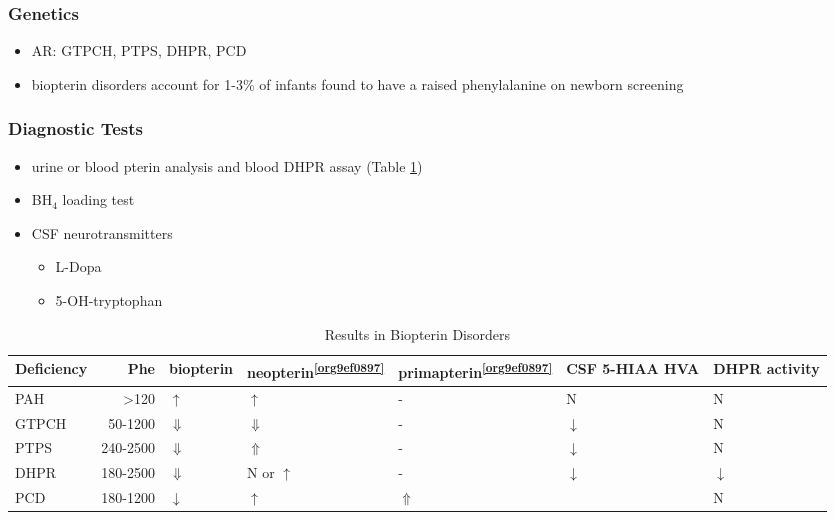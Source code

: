 \documentclass{scrartcl}
\begin{document}
\subsubsection{Genetics}
\label{sec:org8d8c6e4}
\begin{itemize}
\item AR: GTPCH, PTPS, DHPR, PCD
\item biopterin disorders account for 1-3\% of infants found to have a
raised phenylalanine on newborn screening
\end{itemize}

\subsubsection{Diagnostic Tests}
\label{sec:orgf03ea16}
\begin{itemize}
\item urine or blood pterin analysis and blood DHPR assay (Table \ref{tab:org2ac06a1})
\item BH\(_{\text{4}}\) loading test
\item CSF neurotransmitters
\begin{itemize}
\item L-Dopa
\item 5-OH-tryptophan
\end{itemize}
\end{itemize}

\begin{table}[htbp]
\caption{\label{tab:org2ac06a1}
Results in Biopterin Disorders}
\centering
\begin{tabular}{lrlllll}
Deficiency & Phe & biopterin\footnotemark & neopterin\textsuperscript{\ref{org9ef0897}} & primapterin\textsuperscript{\ref{org9ef0897}} & CSF 5-HIAA HVA & DHPR activity\\
\hline
PAH & \textgreater{}120 & \(\uparrow\) & \(\uparrow\) & - & N & N\\
GTPCH & 50-1200 & \(\Downarrow\) & \(\Downarrow\) & - & \(\downarrow\) & N\\
PTPS & 240-2500 & \(\Downarrow\) & \(\Uparrow\) & - & \(\downarrow\) & N\\
DHPR & 180-2500 & \(\Downarrow\) & N or \(\uparrow\) & - & \(\downarrow\) & \(\downarrow\)\\
PCD & 180-1200 & \(\downarrow\) & \(\uparrow\) & \(\Uparrow\) &  & N\\
\end{tabular}
\end{table}
\end{document}

